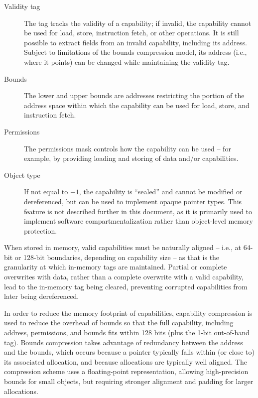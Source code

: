 \documentclass[11pt]{article}
\begin{document}
\begin{description}
\item[Validity tag] The tag tracks the validity of a capability; if invalid,
  the capability cannot be used for load, store, instruction fetch, or other
  operations.
  It is still possible to extract fields from an invalid capability,
  including its address.
  Subject to limitations of the bounds compression model, its address
  (i.e., where it points) can be changed while maintaining the validity tag.

\item[Bounds] The lower and upper bounds are addresses restricting the
  portion of the address space within which the capability can be used for
  load, store, and instruction fetch.

\item[Permissions] The permissions mask controls how the capability can be
  used -- for example, by providing loading and storing of data and/or
  capabilities.

\item[Object type] If not equal to $-1$, the capability is ``sealed'' and
  cannot be modified or dereferenced, but can be used to implement opaque
  pointer types.
  This feature is not described further in this document, as it is primarily
  used to implement software compartmentalization rather than object-level
  memory protection.
\end{description}

When stored in memory, valid capabilities must be naturally aligned -- i.e., at
64-bit or 128-bit boundaries, depending on capability size -- as that is the
granularity at which in-memory tags are maintained.
Partial or complete overwrites with data, rather than a complete overwrite
with a valid capability, lead to the in-memory tag being cleared, preventing
corrupted capabilities from later being dereferenced.

In order to reduce the memory footprint of capabilities, capability
compression is used to reduce the overhead of bounds so that the full
capability, including address, permissions, and bounds fits within 128
bits (plus the 1-bit out-of-band tag).
Bounds compression takes advantage of redundancy between the address
and the bounds, which occurs because a pointer typically falls within (or
close to) its associated allocation, and because allocations are typically
well aligned.
The compression scheme uses a floating-point representation, allowing high-precision bounds for small
objects, but requiring stronger alignment and padding for larger allocations.
\end{document}
